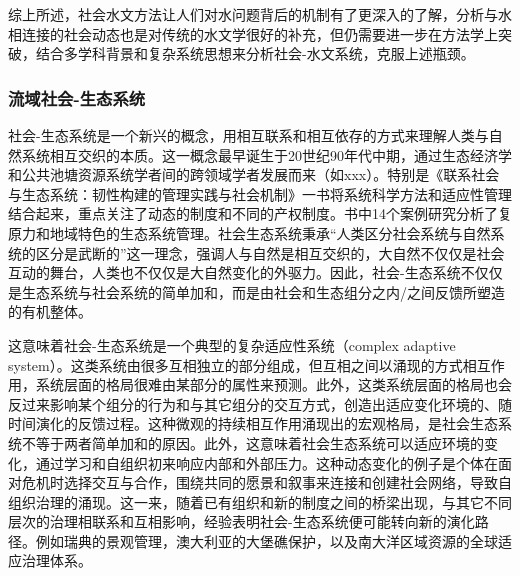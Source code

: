 综上所述，社会水文方法让人们对水问题背后的机制有了更深入的了解，分析与水相连接的社会动态也是对传统的水文学很好的补充，但仍需要进一步在方法学上突破，结合多学科背景和复杂系统思想来分析社会-水文系统，克服上述瓶颈。


\subsubsection*{流域社会-生态系统}
社会-生态系统是一个新兴的概念，用相互联系和相互依存的方式来理解人类与自然系统相互交织的本质。这一概念最早诞生于20世纪90年代中期，通过生态经济学和公共池塘资源系统学者间的跨领域学者发展而来（如xxx）。特别是《联系社会与生态系统：韧性构建的管理实践与社会机制》一书将系统科学方法和适应性管理结合起来，重点关注了动态的制度和不同的产权制度。书中14个案例研究分析了复原力和地域特色的生态系统管理。社会生态系统秉承“人类区分社会系统与自然系统的区分是武断的”这一理念，强调人与自然是相互交织的，大自然不仅仅是社会互动的舞台，人类也不仅仅是大自然变化的外驱力。因此，社会-生态系统不仅仅是生态系统与社会系统的简单加和，而是由社会和生态组分之内/之间反馈所塑造的有机整体。

这意味着社会-生态系统是一个典型的复杂适应性系统（complex adaptive system）。这类系统由很多互相独立的部分组成，但互相之间以涌现的方式相互作用，系统层面的格局很难由某部分的属性来预测。此外，这类系统层面的格局也会反过来影响某个组分的行为和与其它组分的交互方式，创造出适应变化环境的、随时间演化的反馈过程。这种微观的持续相互作用涌现出的宏观格局，是社会生态系统不等于两者简单加和的原因。此外，这意味着社会生态系统可以适应环境的变化，通过学习和自组织初来响应内部和外部压力。这种动态变化的例子是个体在面对危机时选择交互与合作，围绕共同的愿景和叙事来连接和创建社会网络，导致自组织治理的涌现。这一来，随着已有组织和新的制度之间的桥梁出现，与其它不同层次的治理相联系和互相影响，经验表明社会-生态系统便可能转向新的演化路径。例如瑞典的景观管理，澳大利亚的大堡礁保护，以及南大洋区域资源的全球适应治理体系。